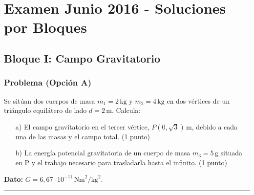 \chapter{Examen Junio 2016 - Soluciones por Bloques}
\label{chap:2016_jun_ord_bloques}

\section{Bloque I: Campo Gravitatorio}
\label{sec:grav_2016_jun_ord}

\subsection{Problema (Opción A)}
\label{subsec:A1_2016_jun_ord_re}

\begin{cajaenunciado}
Se sitúan dos cuerpos de masa $m_{1}=2\,\text{kg}$ y $m_{2}=4\,\text{kg}$ en dos vértices de un triángulo equilátero de lado $d=2\,\text{m}$. Calcula:
\begin{enumerate}
    \item[a)] El campo gravitatorio en el tercer vértice, $P(0,\sqrt{3})\,\text{m}$, debido a cada una de las masas y el campo total. (1 punto)
    \item[b)] La energía potencial gravitatoria de un cuerpo de masa $m_{3}=5\,\text{g}$ situada en P y el trabajo necesario para trasladarla hasta el infinito. (1 punto)
\end{enumerate}
\textbf{Dato:} $G=6,67\cdot10^{-11}\,\text{Nm}^2/\text{kg}^2$.
\end{cajaenunciado}
\hrule

